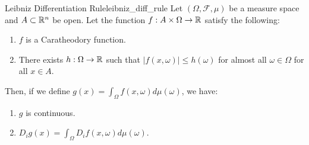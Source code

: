 \begin{proposition}{Leibniz Differentiation Rule}{leibniz_diff_rule}
	Let $(\Omega, \mathcal{F}, \mu)$ be a measure space and $A\subset\mathbb{R}^n$ be open. Let the function $f: A\times\Omega\to\mathbb{R}$ satisfy the following:
	\begin{enumerate}
		\item $f$ is a Caratheodory function.
		\item There exists $h: \Omega\to\mathbb{R}$ such that $|f(x, \omega)|\le h(\omega)$ for almost all $\omega\in\Omega$ for all $x\in A$.
	\end{enumerate}

	\noindent Then, if we define $g(x) = \int_\Omega f(x, \omega)d\mu(\omega)$, we have:
	\begin{enumerate}[label=(\roman*)]
		\item $g$ is continuous.
		\item $D_i g(x) = \int_\Omega D_i f(x, \omega)d\mu(\omega)$.
	\end{enumerate} 
\end{proposition} 
